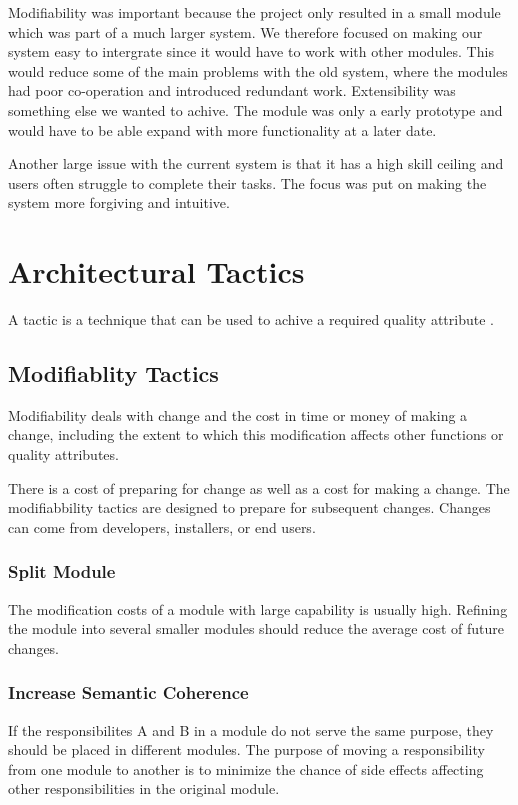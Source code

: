 \documentclass{report}
\begin{document}
Modifiability was important because the project only resulted in a small module which was part of a much larger system. We therefore focused on making our system easy to intergrate since it would have to work with other modules. This would reduce some of the main problems with the old system, where the modules had poor co-operation and introduced redundant work. Extensibility was something else we wanted to achive. The module was only a early prototype and would have to be able expand with more functionality at a later date.

Another large issue with the current system is that it has a high skill ceiling and users often struggle to complete their tasks. The focus was put on making the system more forgiving and intuitive.



\newpage
\section{Architectural Tactics} \label{sec:architectural_tactics}
A tactic is a technique that can be used to achive a required quality attribute \cite[p. 70]{book:bass}.

\subsection{Modifiablity Tactics} 
Modifiability deals with change and the cost in time or money of making a change, including the extent to which this modification affects other functions or quality attributes. \cite[p. 121]{book:bass}

There is a cost of preparing for change as well as a cost for making a change. The modifiabbility tactics are designed to prepare for subsequent changes. Changes can come from developers, installers, or end users. \cite[p. 128]{book:bass}

\subsubsection{Split Module}
The modification costs of a module with large capability is usually high. Refining the module into several smaller modules should reduce the average cost of future changes. \cite[p. 123]{book:bass}

\subsubsection{Increase Semantic Coherence}
If the responsibilites A and B in a module do not serve the same purpose, they should be placed in different modules. The purpose of moving a responsibility from one module to another is to minimize the chance of side effects affecting other responsibilities in the original module. \cite[p. 123]{book:bass}
\end{document}

